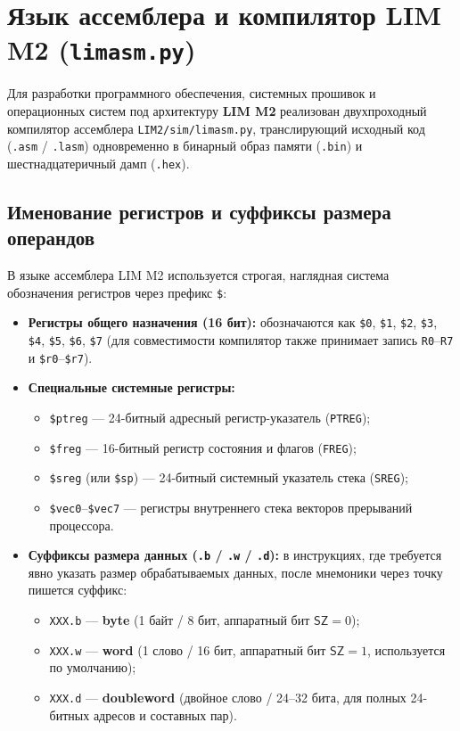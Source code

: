 \documentclass[11pt,a4paper]{article}
\newcommand{\reg}[1]{\texttt{#1}}
\newcommand{\field}[1]{\textsf{#1}}
\begin{document}
\section{Язык ассемблера и компилятор LIM M2 (\texttt{limasm.py})}

Для разработки программного обеспечения, системных прошивок и операционных систем под архитектуру \textbf{LIM M2} реализован двухпроходный компилятор ассемблера \texttt{LIM2/sim/limasm.py}, транслирующий исходный код (\texttt{.asm} / \texttt{.lasm}) одновременно в бинарный образ памяти (\texttt{.bin}) и шестнадцатеричный дамп (\texttt{.hex}).

\subsection{Именование регистров и суффиксы размера операндов}
В языке ассемблера LIM M2 используется строгая, наглядная система обозначения регистров через префикс \texttt{\$}:
\begin{itemize}
  \item \textbf{Регистры общего назначения (16 бит):} обозначаются как \texttt{\$0}, \texttt{\$1}, \texttt{\$2}, \texttt{\$3}, \texttt{\$4}, \texttt{\$5}, \texttt{\$6}, \texttt{\$7} (для совместимости компилятор также принимает запись \texttt{R0}--\texttt{R7} и \texttt{\$r0}--\texttt{\$r7}).
  \item \textbf{Специальные системные регистры:}
    \begin{itemize}
      \item \texttt{\$ptreg} --- 24-битный адресный регистр-указатель (\reg{PTREG});
      \item \texttt{\$freg} --- 16-битный регистр состояния и флагов (\reg{FREG});
      \item \texttt{\$sreg} (или \texttt{\$sp}) --- 24-битный системный указатель стека (\reg{SREG});
      \item \texttt{\$vec0}--\texttt{\$vec7} --- регистры внутреннего стека векторов прерываний процессора.
    \end{itemize}
  \item \textbf{Суффиксы размера данных (\texttt{.b} / \texttt{.w} / \texttt{.d}):} в инструкциях, где требуется явно указать размер обрабатываемых данных, после мнемоники через точку пишется суффикс:
    \begin{itemize}
      \item \texttt{XXX.b} --- \textbf{byte} (1 байт / 8 бит, аппаратный бит $\field{SZ}=0$);
      \item \texttt{XXX.w} --- \textbf{word} (1 слово / 16 бит, аппаратный бит $\field{SZ}=1$, используется по умолчанию);
      \item \texttt{XXX.d} --- \textbf{doubleword} (двойное слово / 24--32 бита, для полных 24-битных адресов и составных пар).
    \end{itemize}
\end{itemize}
\end{document}
